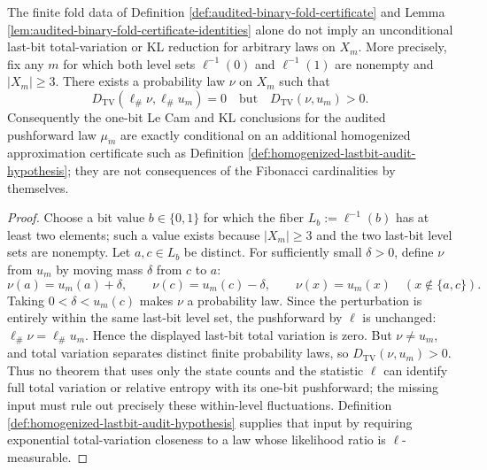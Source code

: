 \begin{theorem}\label{thm:no-unconditional-lastbit-reduction-without-audit}
The finite fold data of Definition \ref{def:audited-binary-fold-certificate} and Lemma \ref{lem:audited-binary-fold-certificate-identities} alone do not imply an unconditional last-bit total-variation or KL reduction for arbitrary laws on \(X_m\).  More precisely, fix any \(m\) for which both level sets \(\ell^{-1}(0)\) and \(\ell^{-1}(1)\) are nonempty and \(|X_m|\ge3\).  There exists a probability law \(\nu\) on \(X_m\) such that
\[
D_{\mathrm{TV}}(\ell_\#\nu,\ell_\#u_m)=0
\quad\text{but}\quad
D_{\mathrm{TV}}(\nu,u_m)>0.
\]
Consequently the one-bit Le Cam and KL conclusions for the audited pushforward law \(\mu_m\) are exactly conditional on an additional homogenized approximation certificate such as Definition \ref{def:homogenized-lastbit-audit-hypothesis}; they are not consequences of the Fibonacci cardinalities by themselves.
\end{theorem}

\begin{proof}
Choose a bit value \(b\in\{0,1\}\) for which the fiber \(L_b:=\ell^{-1}(b)\) has at least two elements; such a value exists because \(|X_m|\ge3\) and the two last-bit level sets are nonempty.  Let \(a,c\in L_b\) be distinct.  For sufficiently small \(\delta>0\), define \(\nu\) from \(u_m\) by moving mass \(
\delta\) from \(c\) to \(a\):
\[
\nu(a)=u_m(a)+\delta,
\qquad
\nu(c)=u_m(c)-\delta,
\qquad
\nu(x)=u_m(x)\quad(x\notin\{a,c\}).
\]
Taking \(0<\delta<u_m(c)\) makes \(\nu\) a probability law.  Since the perturbation is entirely within the same last-bit level set, the pushforward by \(\ell\) is unchanged: \(\ell_\#\nu=\ell_\#u_m\).  Hence the displayed last-bit total variation is zero.  But \(\nu\ne u_m\), and total variation separates distinct finite probability laws, so \(D_{\mathrm{TV}}(\nu,u_m)>0\).  Thus no theorem that uses only the state counts and the statistic \(\ell\) can identify full total variation or relative entropy with its one-bit pushforward; the missing input must rule out precisely these within-level fluctuations.  Definition \ref{def:homogenized-lastbit-audit-hypothesis} supplies that input by requiring exponential total-variation closeness to a law whose likelihood ratio is \(\ell\)-measurable. \qedhere
\end{proof}

